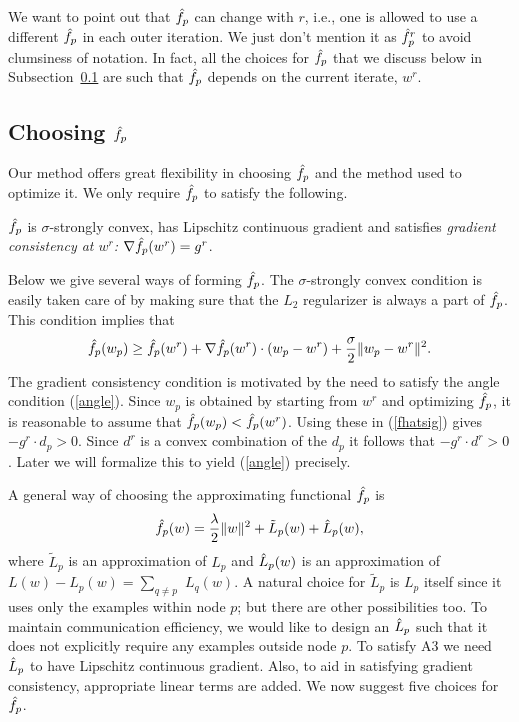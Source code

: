 \documentclass[twoside, 11pt]{article}
\begin{document}
We want to point out that $\hat{f}_p$ can change with $r$, i.e., one is allowed to use a different $\hat{f}_p$ in each outer iteration. We just don't mention it as $\hat{f}_p^r$ to avoid clumsiness of notation. In fact, all the choices for $\hat{f}_p$ that we discuss below in Subsection~\ref{subsec:fhatp} are such that $\hat{f}_p$ depends on the current iterate, $w^r$.

\subsection{Choosing $\hat{f}_p$}
\label{subsec:fhatp}

Our method offers great flexibility in choosing $\hat{f}_p$ and the method used to optimize it. We only require $\hat{f}_p$ to satisfy the following.

 $\hat{f}_p$ is $\sigma$-strongly convex, has Lipschitz continuous gradient and satisfies {\it gradient consistency at $w^r$:} $\nabla\hat{f}_p(w^r)=g^r$.

Below we give several ways of forming $\hat{f}_p$. The $\sigma$-strongly convex condition is easily taken care of by making sure that the $L_2$ regularizer is always a part of $\hat{f}_p$. This condition implies that
\begin{equation}
\hat{f}_p(w_p) \ge \hat{f}_p(w^r) + \nabla\hat{f}_p(w^r)\cdot (w_p-w^r) + \frac{\sigma}{2} \|w_p-w^r\|^2.
\label{fhatsig}
\end{equation}
The gradient consistency condition is motivated by the need to satisfy the angle condition (\ref{angle}). Since $w_p$ is obtained by starting from $w^r$ and optimizing $\hat{f}_p$, it is reasonable to assume that $\hat{f}_p(w_p)<\hat{f}_p(w^r)$. Using these in (\ref{fhatsig}) gives $-g^r\cdot d_p > 0$. Since $d^r$ is a convex combination of the $d_p$ it follows that $-g^r\cdot d^r > 0$. Later we will formalize this to yield (\ref{angle}) precisely.

\def\Ltilde{\tilde{L}}

A general way of choosing the approximating functional $\hat{f}_p$ is
\begin{equation}
\fhat_p(w) = \frac{\lambda}{2} \|w\|^2 + \Ltilde_p(w) +\Lhat_p(w),
\label{riskapp}
\end{equation}
where $\Ltilde_p$ is an approximation of $L_p$ and $\hat{L}_p(w)$ is an approximation of $L(w)-L_p(w)=\sum_{q\not= p}$ $L_q(w)$. A natural choice for $\Ltilde_p$ is $L_p$ itself since it uses only the examples within node $p$; but there are other possibilities too. To maintain communication efficiency, we would like to design an $\hat{L}_p$ such that it does not explicitly require any examples outside node $p$. To satisfy A3 we need $\hat{L}_p$ to have Lipschitz continuous gradient. Also, to aid in satisfying gradient consistency, appropriate linear terms are added. We now suggest five choices for $\hat{f}_p$.
\end{document}
